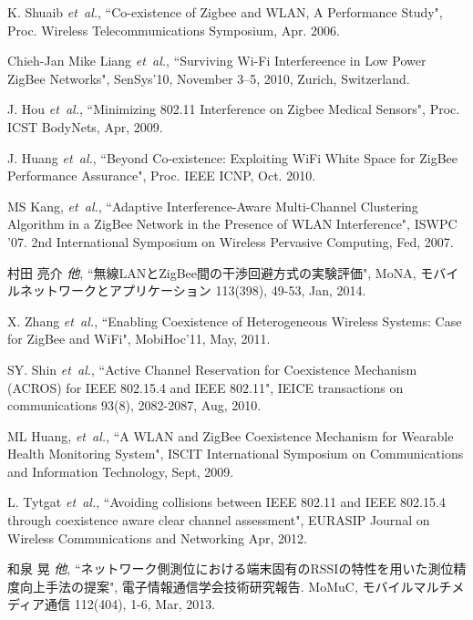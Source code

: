 \documentclass[technicalreport]{ieicej}
\begin{document}
\begin{thebibliography}{99}

K. Shuaib  \textit{et~al.},
``Co-existence of Zigbee and WLAN, A Performance Study", 
Proc. Wireless Telecommunications Symposium, 
Apr. 2006.

Chieh-Jan Mike Liang \textit{et~al.},
``Surviving Wi-Fi Interfereence in Low Power ZigBee Networks", 
SenSys’10, 
November 3–5, 2010, 
Zurich, Switzerland.

J. Hou \textit{et~al.},
``Minimizing 802.11 Interference on Zigbee Medical Sensors", 
Proc. ICST BodyNets,
Apr, 2009.

J. Huang \textit{et~al.},
``Beyond Co-existence: Exploiting WiFi White Space for ZigBee Performance Assurance", 
Proc. IEEE ICNP,
Oct. 2010.

MS Kang, \textit{et~al.},
``Adaptive Interference-Aware Multi-Channel Clustering Algorithm in a ZigBee Network in the Presence of WLAN Interference", 
ISWPC '07. 2nd International Symposium on Wireless Pervasive Computing, Fed, 2007.

村田 亮介 \textit{他},
``無線LANとZigBee間の干渉回避方式の実験評価", 
MoNA, モバイルネットワークとアプリケーション 113(398), 49-53, 
Jan, 2014.

X. Zhang \textit{et~al.},
``Enabling Coexistence of Heterogeneous Wireless Systems: Case for ZigBee and WiFi", 
MobiHoc’11, May, 2011.

SY. Shin \textit{et~al.},
``Active Channel Reservation for Coexistence Mechanism (ACROS) for IEEE 802.15.4 and IEEE 802.11", 
IEICE transactions on communications 93(8), 2082-2087, Aug, 2010.

ML Huang, \textit{et~al.},
``A WLAN and ZigBee Coexistence Mechanism for Wearable Health Monitoring System", 
ISCIT International Symposium on Communications and Information Technology, Sept, 2009.

L. Tytgat \textit{et~al.},
``Avoiding collisions between IEEE 802.11 and IEEE 802.15.4 through coexistence aware clear channel assessment", 
EURASIP Journal on Wireless Communications and Networking
Apr, 2012.

和泉 晃 \textit{他},
``ネットワーク側測位における端末固有のRSSIの特性を用いた測位精度向上手法の提案", 
電子情報通信学会技術研究報告. MoMuC, モバイルマルチメディア通信 112(404), 1-6, Mar, 2013. 


\end{thebibliography}
\end{document}

